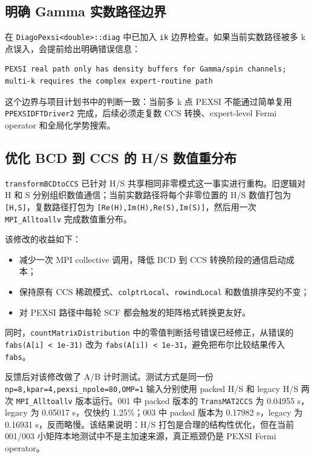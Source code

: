 \documentclass[a4paper,11pt]{article}
\newcommand{\code}[1]{\texttt{#1}}
\begin{document}
\subsection{明确 Gamma 实数路径边界}

在 \code{DiagoPexsi<double>::diag} 中已加入 \code{ik} 边界检查。如果当前实数路径被多 k 点误入，会提前给出明确错误信息：

\begin{verbatim}
PEXSI real path only has density buffers for Gamma/spin channels;
multi-k requires the complex expert-routine path
\end{verbatim}

这个边界与项目计划书中的判断一致：当前多 k 点 PEXSI 不能通过简单复用 \code{PPEXSIDFTDriver2} 完成，后续必须走复数 CCS 转换、expert-level Fermi operator 和全局化学势搜索。

\subsection{优化 BCD 到 CCS 的 H/S 数值重分布}

\code{transformBCDtoCCS} 已针对 H/S 共享相同非零模式这一事实进行重构。旧逻辑对 H 和 S 分别组织数值通信；当前实数路径将每个非零位置的 H/S 数值打包为 \code{[H,S]}，复数路径打包为 \code{[Re(H),Im(H),Re(S),Im(S)]}，然后用一次 \code{MPI\_Alltoallv} 完成数值重分布。

该修改的收益如下：

\begin{itemize}
    \item 减少一次 MPI collective 调用，降低 BCD 到 CCS 转换阶段的通信启动成本；
    \item 保持原有 CCS 稀疏模式、\code{colptrLocal}、\code{rowindLocal} 和数值排序契约不变；
    \item 对 PEXSI 路径中每轮 SCF 都会触发的矩阵格式转换更友好。
\end{itemize}

同时，\code{countMatrixDistribution} 中的零值判断括号错误已经修正，从错误的 \code{fabs(A[i] < 1e-31)} 改为 \code{fabs(A[i]) < 1e-31}，避免把布尔比较结果传入 \code{fabs}。

反馈后对该修改做了 A/B 计时测试。测试方式是同一份 \code{np=8,kpar=4,pexsi\_npole=80,OMP=1} 输入分别使用 packed H/S 和 legacy H/S 两次 \code{MPI\_Alltoallv} 版本运行。001 中 packed 版本的 \code{TransMAT2CCS} 为 0.04955 s，legacy 为 0.05017 s，仅快约 1.25\%；003 中 packed 版本为 0.17982 s，legacy 为 0.16931 s，反而略慢。该结果说明：H/S 打包是合理的结构性优化，但在当前 001/003 小矩阵本地测试中不是主加速来源，真正瓶颈仍是 PEXSI Fermi operator。
\end{document}
